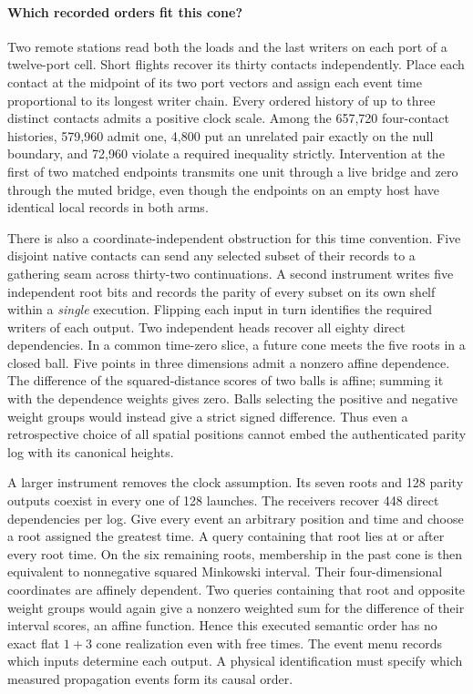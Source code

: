 \documentclass[11pt]{article}
\begin{document}
\paragraph{Which recorded orders fit this cone?}
Two remote stations read both the loads and the last writers on each port of
a twelve-port cell. Short flights recover its thirty contacts independently.
Place each contact at the midpoint of its two port vectors and assign each
event time proportional to its longest writer chain. Every ordered history
of up to three distinct contacts admits a positive clock scale. Among the
657,720 four-contact histories, 579,960 admit one, 4,800 put an unrelated
pair exactly on the null boundary, and 72,960 violate a required inequality
strictly. Intervention at the first of two matched endpoints transmits one
unit through a live bridge and zero through the muted bridge, even though
the endpoints on an empty host have identical local records in both arms.

There is also a coordinate-independent obstruction for this time convention.
Five disjoint native contacts can send any selected subset of their records
to a gathering seam across thirty-two continuations. A second instrument
writes five independent root bits and records the parity of every subset on
its own shelf within a \emph{single} execution. Flipping each input in turn
identifies the required writers of each output. Two independent heads recover
all eighty direct dependencies. In a common time-zero slice, a future cone
meets the five roots in a closed ball. Five points in three dimensions admit
a nonzero affine dependence. The difference of the squared-distance scores
of two balls is affine; summing it with the dependence weights gives zero.
Balls selecting the positive and negative weight groups would instead give a
strict signed difference. Thus even a retrospective choice of all spatial
positions cannot embed the authenticated parity log with its canonical
heights.

A larger instrument removes the clock assumption. Its seven roots and 128
parity outputs coexist in every one of 128 launches. The receivers recover
448 direct dependencies per log. Give every event an arbitrary position and
time and choose a root assigned the greatest time. A query containing that
root lies at or after every root time. On the six remaining roots, membership
in the past cone is then equivalent to nonnegative squared Minkowski
interval. Their four-dimensional coordinates are affinely dependent. Two
queries containing that root and opposite weight groups would again
give a nonzero weighted sum for the difference of their interval scores, an
affine function. Hence this executed semantic order has no exact flat
$1+3$ cone realization even with free times. The event menu records which
inputs determine each output. A physical identification must specify which
measured propagation events form its causal order.
\end{document}
